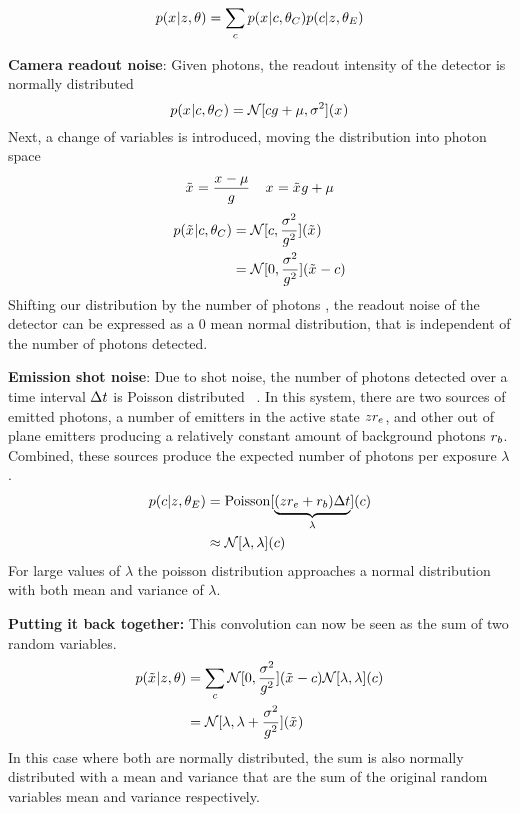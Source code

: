   \begin{equation}
    p(x_{}|z_{},\theta) = \sum_c p(x_{}|c,\theta_C)p(c|z_{},\theta_E)
  \end{equation}

\textbf{Camera readout noise}:
  Given \photons photons, the readout intensity of the detector is normally distributed
  \begin{equation}
    p(x_{}|c,\theta_C) = \mathcal{N}[cg + \mu, \sigma^2](x_{})
  \end{equation}
  Next, a change of variables is introduced, moving the distribution into photon space
  \begin{equation}
    \tilde{x}_{} = \frac{x_{} - \mu}{g}
    \;\;\;\;
    x_{} = \tilde{x}_{}g + \mu
  \end{equation}
  \begin{align}
    p(\tilde{x}_{}|c,\theta_C)
      &= \mathcal{N}[c, \frac{\sigma^2}{g^2}](\tilde{x}_{}) \\
      &= \mathcal{N}[0, \frac{\sigma^2}{g^2}](\tilde{x}_{} - c)
  \end{align}
  Shifting our distribution by the number of photons \photons, the readout noise of the detector can be expressed as a 0 mean 
  normal distribution, that is independent of the number of photons detected.

\textbf{Emission shot noise}:
  Due to shot noise, the number of photons detected over a time interval $\Delta t$ is Poisson
  distributed~\cite{mehta_poisson_2016} . In this system, there are two sources of emitted photons, a number of emitters in the active state $z_{}r_e$,
  and other out of plane emitters producing a relatively constant amount of background photons $r_b$. Combined, 
  these sources produce the expected number of photons per exposure $\lambda$.
  \begin{align}
    p(c|z_{},\theta_E)
      &= \operatorname{Poisson}[\underbrace{(z_{}r_e + r_b)\Delta t}_{\lambda}](c) \\
      &\approx \mathcal{N}[\lambda, \lambda](c)
  \end{align}
  For large values of $\lambda$ the poisson distribution approaches a normal distribution with both mean and variance of $\lambda$.

\textbf{Putting it back together:}
This convolution can now be seen as the sum of two random variables.
  \begin{align}
    p(\tilde{x}_{}|z_{},\theta)
      &= \sum_c
        \mathcal{N}[0, \frac{\sigma^2}{g^2}](\tilde{x}_{} - c)
        \mathcal{N}[\lambda, \lambda](c) \\
      &= \mathcal{N}[\lambda, \lambda + \frac{\sigma^2}{g^2}](\tilde{x}_{})
  \end{align}
  In this case where both are normally distributed, the sum is also normally distributed with 
  a mean and variance that are the sum of the original random variables mean and variance respectively. 

